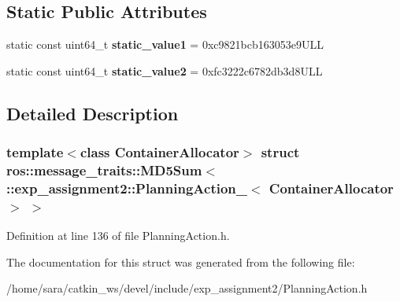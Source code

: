 \subsection*{Static Public Attributes}
\begin{DoxyCompactItemize}
\item 
\mbox{\label{structros_1_1message__traits_1_1MD5Sum_3_01_1_1exp__assignment2_1_1PlanningAction___3_01ContainerAllocator_01_4_01_4_a54cb52e0b7d9696bdcf273e82bd4ff89}} 
static const uint64\+\_\+t {\bfseries static\+\_\+value1} = 0xc9821bcb163053e9\+U\+LL
\item 
\mbox{\label{structros_1_1message__traits_1_1MD5Sum_3_01_1_1exp__assignment2_1_1PlanningAction___3_01ContainerAllocator_01_4_01_4_a3f0a6288c8f0af41d539b356fada6a93}} 
static const uint64\+\_\+t {\bfseries static\+\_\+value2} = 0xfc3222c6782db3d8\+U\+LL
\end{DoxyCompactItemize}


\subsection{Detailed Description}
\subsubsection*{template$<$class Container\+Allocator$>$\newline
struct ros\+::message\+\_\+traits\+::\+M\+D5\+Sum$<$ \+::exp\+\_\+assignment2\+::\+Planning\+Action\+\_\+$<$ Container\+Allocator $>$ $>$}



Definition at line 136 of file Planning\+Action.\+h.



The documentation for this struct was generated from the following file\+:\begin{DoxyCompactItemize}
\item 
/home/sara/catkin\+\_\+ws/devel/include/exp\+\_\+assignment2/Planning\+Action.\+h\end{DoxyCompactItemize}
